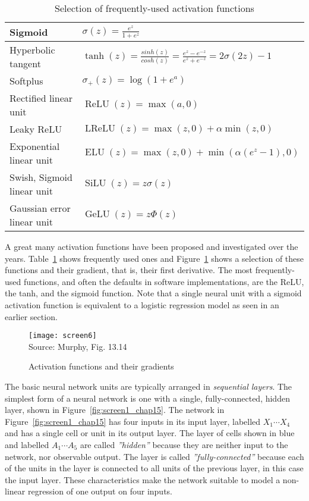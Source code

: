 \begin{table}
\renewcommand{\arraystretch}{1.5}

\begin{tabular}{l|l} \hline
Sigmoid & $\sigma(z) = \frac{e^z}{1+e^z}$  \\ \hline
Hyperbolic tangent & $\tanh(z)=\frac{sinh(z)}{cosh(z)} = \frac{e^z-e^{-z}}{e^z+e^{-z}} = 2\sigma(2z)-1$  \\ \hline
Softplus & $\sigma_+(z) = \log(1+e^a)$ \\ \hline
Rectified linear unit & $\operatorname{ReLU}(z) = \max(a, 0) $ \\ \hline
Leaky ReLU & $\operatorname{LReLU}(z)=\max(z, 0) + \alpha \min(z, 0)$  \\ \hline
Exponential linear unit & $\operatorname{ELU}(z) = \max(z, 0) + \min(\alpha(e^z-1), 0)$ \\ \hline
Swish, Sigmoid linear unit & $\operatorname{SiLU}(z) = z \sigma(z)$ \\ \hline
Gaussian error linear unit & $\operatorname{GeLU}(z) = z \Phi(z)$ \\ \hline
\end{tabular}
\caption{Selection of frequently-used activation functions}
\label{tab:activation}
\end{table}

A great many activation functions have been proposed and investigated over the years. Table~\ref{tab:activation} shows frequently used ones and Figure~\ref{fig:activation} shows a selection of these functions and their gradient, that is, their first derivative. The most frequently-used functions, and often the defaults in software implementations, are the ReLU, the tanh, and the sigmoid function. Note that a single neural unit with a sigmoid activation function is equivalent to a logistic regression model as seen in an earlier section.

\begin{figure}
\centering
\texttt{[image: screen6]} \\

\scriptsize Source: Murphy, Fig. 13.14
\caption{Activation functions and their gradients}
\label{fig:activation}
\end{figure}

The basic neural network units are typically arranged in \emph{sequential layers}. The simplest form of a neural network is one with a single, fully-connected, hidden layer, shown in Figure~\ref{fig:screen1_chap15}. The network in Figure~\ref{fig:screen1_chap15} has four inputs in its input layer, labelled $X_1 \cdots X_4$ and has a single cell or unit in its output layer. The layer of cells shown in blue and labelled $A_1 \cdots A_5$ are called \emph{''hidden''} because they are neither input to the network, nor observable output. The layer is called \emph{''fully-connected''} because each of the units in the layer is connected to all units of the previous layer, in this case the input layer. These characteristics make the network suitable to model a non-linear regression of one output on four inputs. 

